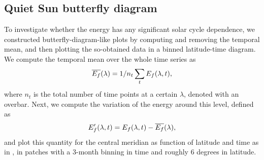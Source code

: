 \documentclass{aa}
\begin{document}


\subsection{Quiet Sun \fff butterfly diagram}\label{qsf}

To investigate whether the \fff energy has any significant solar cycle dependence, we constructed butterfly-diagram-like plots by computing and removing the temporal mean, and then plotting the so-obtained data in a binned latitude-time diagram. 
We compute the temporal mean over the whole time series as 
\begin{equation}
    \overline{E_f}(\lambda) = 1/n_t \sum_t E_f(\lambda,t),
\end{equation}
where $n_t$ is the total number of time points at a certain $\lambda$,  denoted with an overbar. Next, we compute the variation of the \fff energy around this level, defined as
\begin{equation}
    E_f'(\lambda,t)=E_f(\lambda,t)-\overline{E_f}(\lambda),
\end{equation}
and plot this quantity
for the central meridian
as function of latitude and time as in , 
in patches 
with a 3-month binning in time and roughly 6 degrees in latitude. 
\end{document}
